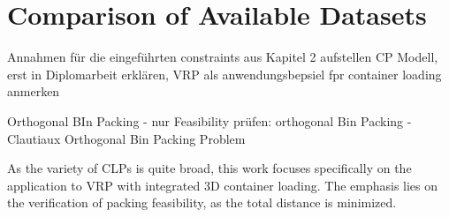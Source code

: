 \chapter{Comparison of Available Datasets}
Annahmen für die eingeführten constraints aus Kapitel 2 aufstellen
CP Modell, erst in Diplomarbeit erklären,
VRP als anwendungsbepsiel fpr container loading anmerken

Orthogonal BIn Packing - nur Feasibility prüfen:
orthogonal Bin Packing - Clautiaux Orthogonal Bin Packing Problem




As the variety of \gls{CLP}s is quite broad, this work focuses specifically on
the application to \gls{VRP} with integrated \gls{3D} container loading. The emphasis lies
on the verification of packing feasibility, as the total distance is minimized.